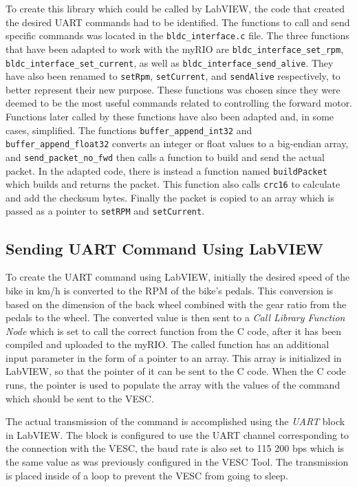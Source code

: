 To create this library which could be called by LabVIEW, the code that created the desired UART commands had to be identified. The functions to call and send specific commands was located in the \texttt{bldc\_interface.c} file. The three functions that have been adapted to work with the myRIO are \texttt{bldc\_interface\_set\_rpm}, \texttt{bldc\_interface\_set\_current}, as well as  \texttt{bldc\_interface\_send\_alive}. They have also been renamed to \texttt{setRpm}, \texttt{setCurrent}, and \texttt{sendAlive} respectively, to better represent  their new purpose. These functions was chosen since they were deemed to be the most useful commands related to controlling the forward motor. Functions later called by these functions have also been adapted and, in some cases, simplified. The functions \texttt{buffer\_append\_int32} and \texttt{buffer\_append\_float32} converts an integer or float values to a big-endian array, and \texttt{send\_packet\_no\_fwd} then calls a function to build and send the actual packet. In the adapted code, there is instead a function named \texttt{buildPacket} which builds and returns the packet. This function also calls \texttt{crc16} to calculate and add the checksum bytes. Finally the packet is copied to an array which is passed as a pointer to \texttt{setRPM} and \texttt{setCurrent}.

\subsection{Sending UART Command Using LabVIEW}

To create the UART command using LabVIEW, initially the desired speed of the bike in km/h is converted to the RPM of the bike's pedals. This conversion is based on the dimension of the back wheel combined with the gear ratio from the pedals to the wheel. The converted value is then sent to a \textit{Call Library Function Node} which is set to call the correct function from the C code, after it has been compiled and uploaded to the myRIO. The called function has an additional input parameter in the form of a pointer to an array. This array is initialized in LabVIEW, so that the pointer of it can be sent to the C code. When the C code runs, the pointer is used to populate the array with the values of the command which should be sent to the VESC. 

The actual transmission of the command is accomplished using the \textit{UART} block in LabVIEW. The block is configured to use the UART channel corresponding to the connection with the VESC, the baud rate is also set to 115 200 bps which is the same value as was previously configured in the VESC Tool. The transmission is placed inside of a loop to prevent the VESC from going to sleep.

